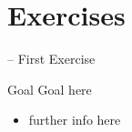 \documentclass[presentation]{beamer}\mode<presentation>{\usetheme{AMSBolognaFC}}
\begin{document}
\section{Exercises}

\startExercise

\begin{frame}{\currentExercise{} -- First Exercise}
	\begin{block}{Goal}
		Goal here
	\end{block}
	\begin{itemize}
		\item further info here
	\end{itemize}
\end{frame}

\section*{}

\frame{\titlepage}

\section*{\refname}

\begin{frame}[c,noframenumbering]{\refname}
	\scriptsize
	
	
\end{frame}

\end{document}
